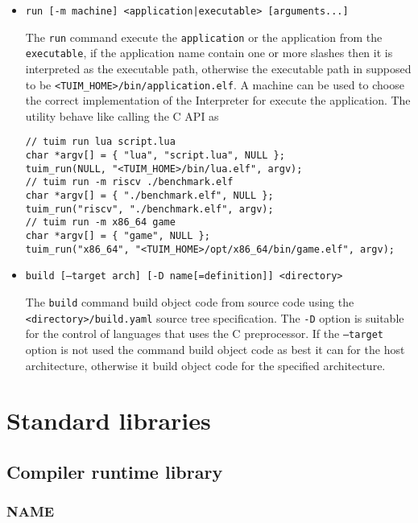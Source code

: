 \begin{itemize}

   \item \texttt{run [-m machine] <application|executable> [arguments...]}

   The \texttt{run} command execute the \texttt{application}
   or the application from the \texttt{executable},
   if the application name contain one or more slashes
   then it is interpreted as the executable path,
   otherwise the executable path in supposed to be
   \texttt{<TUIM\_HOME>/bin/application.elf}.
   A machine can be used to choose the correct implementation of the
   Interpreter for execute the application.
   The utility behave like calling the C API as

\begin{lstlisting}[style=c]
// tuim run lua script.lua
char *argv[] = { "lua", "script.lua", NULL };
tuim_run(NULL, "<TUIM_HOME>/bin/lua.elf", argv);
// tuim run -m riscv ./benchmark.elf
char *argv[] = { "./benchmark.elf", NULL };
tuim_run("riscv", "./benchmark.elf", argv);
// tuim run -m x86_64 game
char *argv[] = { "game", NULL };
tuim_run("x86_64", "<TUIM_HOME>/opt/x86_64/bin/game.elf", argv);
\end{lstlisting}

   \item \texttt{build [--target arch] [-D name[=definition]] <directory>}

   The \texttt{build} command build object code from source code
   using the \texttt{<directory>/build.yaml} source tree specification.
   The \texttt{-D} option is suitable for the control of languages that uses
   the C preprocessor.
   If the \texttt{--target} option is not used the command build object code
   as best it can for the host architecture, otherwise it build object code
   for the specified architecture.

\end{itemize}

\section{Standard libraries}
\label{section:libraries}

\subsection{Compiler runtime library}

\subsubsection*{NAME}

